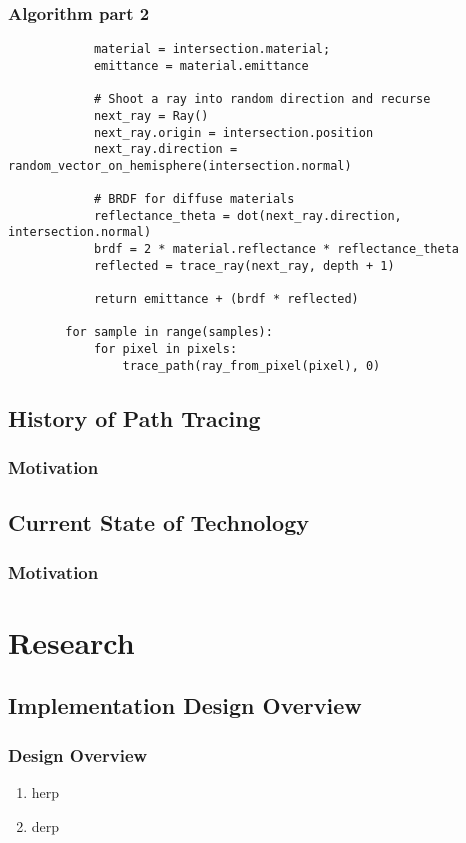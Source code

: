 \documentclass{beamer}
\begin{document}
\begin{frame}[fragile]
    \frametitle{Algorithm part 2}
    \scriptsize
    \begin{verbatim}
            material = intersection.material;
            emittance = material.emittance

            # Shoot a ray into random direction and recurse
            next_ray = Ray()
            next_ray.origin = intersection.position
            next_ray.direction = random_vector_on_hemisphere(intersection.normal)

            # BRDF for diffuse materials
            reflectance_theta = dot(next_ray.direction, intersection.normal)
            brdf = 2 * material.reflectance * reflectance_theta
            reflected = trace_ray(next_ray, depth + 1)

            return emittance + (brdf * reflected)

        for sample in range(samples):
            for pixel in pixels:
                trace_path(ray_from_pixel(pixel), 0)
    \end{verbatim}
\end{frame}

\subsection{History of Path Tracing}
\begin{frame}
    \frametitle{Motivation}
    \lipsum[2]
\end{frame}

\subsection{Current State of Technology}
\begin{frame}
    \frametitle{Motivation}
    \lipsum[2]
\end{frame}

\section{Research}
\subsection{Implementation Design Overview}
\begin{frame}
    \frametitle{Design Overview}
    \begin{enumerate}
        \item herp
        \item derp
    \end{enumerate}
\end{frame}
\end{document}
